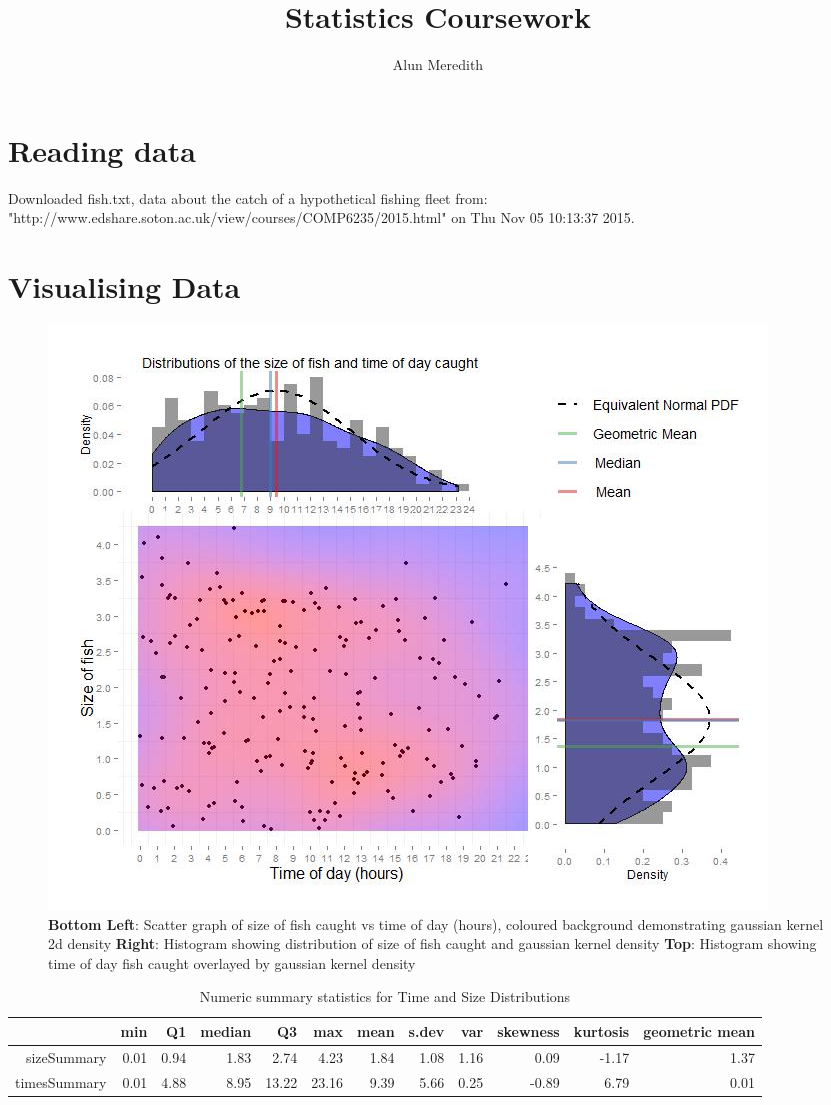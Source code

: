 \documentclass{article}
\begin{document}



\title{Statistics Coursework}
\author{Alun Meredith}
\maketitle
\section{Reading data}
Downloaded fish.txt, data about the catch of a hypothetical fishing fleet from:\\"http://www.edshare.soton.ac.uk/view/courses/COMP6235/2015.html" on Thu Nov 05 10:13:37 2015. 
\section{Visualising Data}
\begin{figure}[h]
\includegraphics[width=\linewidth]{figure1.jpg}
\caption{\textbf{Bottom Left}: Scatter graph of size of fish caught vs time of day (hours), coloured background demonstrating gaussian kernel 2d density \textbf{Right}: Histogram showing distribution of size of fish caught and gaussian kernel density \textbf{Top}: Histogram showing time of day fish caught overlayed by gaussian kernel density}
\label{fig:1}
\end{figure}
\begin{table}[ht]
\centering
\caption{Numeric summary statistics for Time and Size Distributions} 
\begin{tabular}{rrrrrrrrrrrr}
  \hline
 & min & Q1 & median & Q3 & max & mean & s.dev & var & skewness & kurtosis & geometric mean \\ 
  \hline
sizeSummary & 0.01 & 0.94 & 1.83 & 2.74 & 4.23 & 1.84 & 1.08 & 1.16 & 0.09 & -1.17 & 1.37 \\ 
  timesSummary & 0.01 & 4.88 & 8.95 & 13.22 & 23.16 & 9.39 & 5.66 & 0.25 & -0.89 & 6.79 & 0.01 \\ 
   \hline
\end{tabular}
\end{table}
\end{document}
